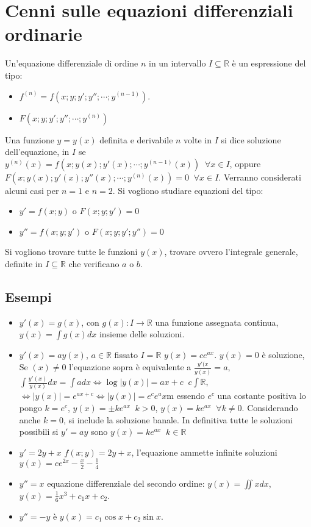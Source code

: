 \chapter{Cenni sulle equazioni differenziali ordinarie}
Un'equazione differenziale di ordine $n$ in un intervallo $I\subseteq\mathbb{R}$ \`e un espressione del tipo:
\begin{itemize}
\item $f^{(n)}=f(x;y;y';y'';\cdots;y^{(n-1)})$.
\item $F(x;y;y';y'';\cdots;y^{(n)})$
\end{itemize}
Una funzione $y=y(x)$ definita e derivabile $n$ volte in $I$ si dice soluzione dell'equazione, in $I$ se $y^{(n)}(x)=f(x;y(x);y'(x);\cdots;y^{(n-1)}(x))\;\;\forall x\in I$, 
oppure $F(x;y(x);y'(x);y''(x);\cdots;y^{(n)}(x))=0\;\;\forall x\in I$. Verranno considerati alcuni casi per $n=1$ e $n=2$. Si vogliono studiare equazioni del tipo:
\begin{itemize}
\item $y'=f(x;y)$ o $F(x;y;y')=0$
\item $y''=f(x;y;y')$ o $F(x;y;y';y'')=0$
\end{itemize}
Si vogliono trovare tutte le funzioni $y(x)$, trovare ovvero l'integrale generale, definite in $I\subseteq\mathbb{R}$ che verificano $a$ o $b$.
\section{Esempi}
\begin{itemize}
\item $y'(x)=g(x)$, con $g(x):I\rightarrow\mathbb{R}$ una funzione assegnata continua, $y(x)=\int g(x)dx$ insieme delle soluzioni.
\item $y'(x)=ay(x)$, $a\in\mathbb{R}$ fissato $I=\mathbb{R}$ $y(x)=ce^{ax}$. $y(x)=0$ \`e soluzione, Se $(x)\neq 0$ l'equazione sopra \`e equivalente a $\frac{y'(x}{y(x)}=a$, 
$\int \frac{y'(x)}{y(x)}dx=\int adx\Leftrightarrow\log |y(x)|=ax+c\;\;c\int\mathbb{R}$, $\Leftrightarrow|y(x)|=e^{ax+c}\Leftrightarrow|y(x)|=e^ce^ax$m essendo $e^c$ una costante
positiva lo pongo $k=e^c$, $y(x)=\pm ke^{ax}\;\;k>0$, $y(x)=ke^{ax}\;\;\forall k\neq 0$. Considerando anche $k=0$, si include la soluzione banale. In definitiva tutte le 
soluzioni possibili si $y'=ay$ sono $y(x)=ke^{ax}\;\;k\in\mathbb{R}$
\item $y'=2y+x$ $f(x;y)=2y+x$, l'equazione ammette infinite soluzioni $y(x)=ce^{2x}-\frac{x}{2}-\frac{1}{4}$
\item $y''=x$ equazione differenziale del secondo ordine: $y(x)=\iint xdx$, $y(x)=\frac{1}{6}x^3+c_1x+c_2$.
\item $y''=-y$ \`e $y(x)=c_1\cos x+c_2\sin x$.
\end{itemize}
